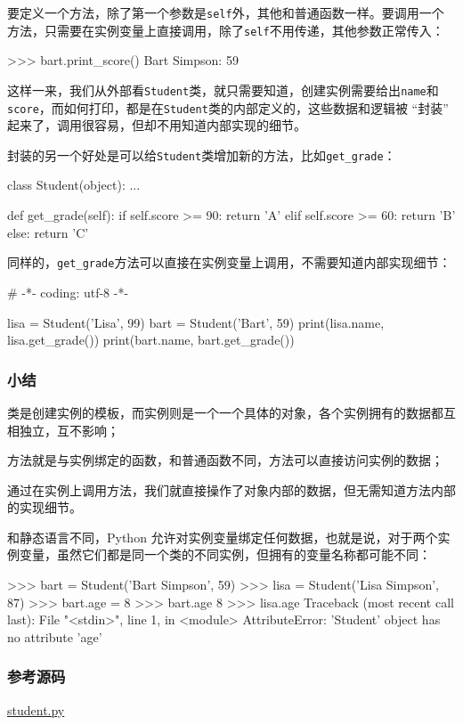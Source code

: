 要定义一个方法，除了第一个参数是\texttt{self}外，其他和普通函数一样。要调用一个方法，只需要在实例变量上直接调用，除了\texttt{self}不用传递，其他参数正常传入：

\begin{pythoncode}
>>> bart.print_score()
Bart Simpson: 59
\end{pythoncode}

这样一来，我们从外部看\texttt{Student}类，就只需要知道，创建实例需要给出\texttt{name}和\texttt{score}，而如何打印，都是在\texttt{Student}类的内部定义的，这些数据和逻辑被
``封装'' 起来了，调用很容易，但却不用知道内部实现的细节。

封装的另一个好处是可以给\texttt{Student}类增加新的方法，比如\texttt{get\_grade}：

\begin{pythoncode}
class Student(object):
    ...

    def get_grade(self):
        if self.score >= 90:
            return 'A'
        elif self.score >= 60:
            return 'B'
        else:
            return 'C'
\end{pythoncode}

同样的，\texttt{get\_grade}方法可以直接在实例变量上调用，不需要知道内部实现细节：

\begin{pythoncode}
# -*- coding: utf-8 -*-
\end{pythoncode}

\begin{pythoncode}
lisa = Student('Lisa', 99)
bart = Student('Bart', 59)
print(lisa.name, lisa.get_grade())
print(bart.name, bart.get_grade())
\end{pythoncode}

\hypertarget{ux5c0fux7ed3}{%
\subsubsection{小结}\label{ux5c0fux7ed3}}

类是创建实例的模板，而实例则是一个一个具体的对象，各个实例拥有的数据都互相独立，互不影响；

方法就是与实例绑定的函数，和普通函数不同，方法可以直接访问实例的数据；

通过在实例上调用方法，我们就直接操作了对象内部的数据，但无需知道方法内部的实现细节。

和静态语言不同，Python
允许对实例变量绑定任何数据，也就是说，对于两个实例变量，虽然它们都是同一个类的不同实例，但拥有的变量名称都可能不同：

\begin{pythoncode}
>>> bart = Student('Bart Simpson', 59)
>>> lisa = Student('Lisa Simpson', 87)
>>> bart.age = 8
>>> bart.age
8
>>> lisa.age
Traceback (most recent call last):
  File "<stdin>", line 1, in <module>
AttributeError: 'Student' object has no attribute 'age'
\end{pythoncode}

\hypertarget{ux53c2ux8003ux6e90ux7801}{%
\subsubsection{参考源码}\label{ux53c2ux8003ux6e90ux7801}}

\href{https://github.com/michaelliao/learn-python3/blob/master/samples/oop_basic/student.py}{student.py}

